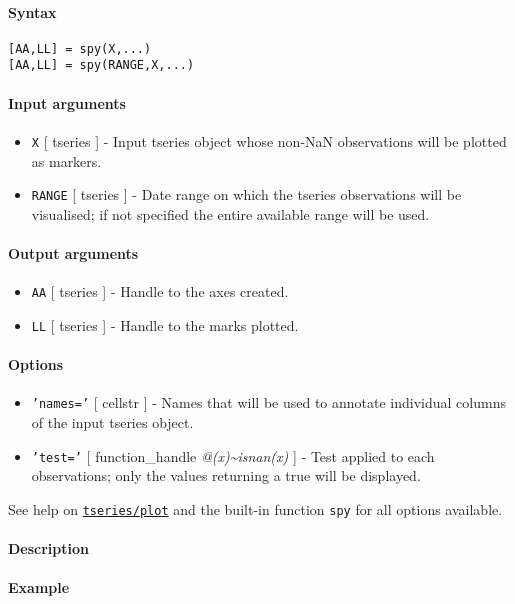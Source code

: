 


	\paragraph{Syntax}

\begin{verbatim}
[AA,LL] = spy(X,...)
[AA,LL] = spy(RANGE,X,...)
\end{verbatim}

\paragraph{Input arguments}

\begin{itemize}
\item
  \texttt{X} {[} tseries {]} - Input tseries object whose non-NaN
  observations will be plotted as markers.
\item
  \texttt{RANGE} {[} tseries {]} - Date range on which the tseries
  observations will be visualised; if not specified the entire available
  range will be used.
\end{itemize}

\paragraph{Output arguments}

\begin{itemize}
\item
  \texttt{AA} {[} tseries {]} - Handle to the axes created.
\item
  \texttt{LL} {[} tseries {]} - Handle to the marks plotted.
\end{itemize}

\paragraph{Options}

\begin{itemize}
\item
  \texttt{'names='} {[} cellstr {]} - Names that will be used to
  annotate individual columns of the input tseries object.
\item
  \texttt{'test='} {[} function\_handle \textbar{}
  \emph{@(x)\textasciitilde{}isnan(x)} {]} - Test applied to each
  observations; only the values returning a true will be displayed.
\end{itemize}

See help on \href{tseries/plot}{\texttt{tseries/plot}} and the built-in
function \texttt{spy} for all options available.

\paragraph{Description}

\paragraph{Example}


